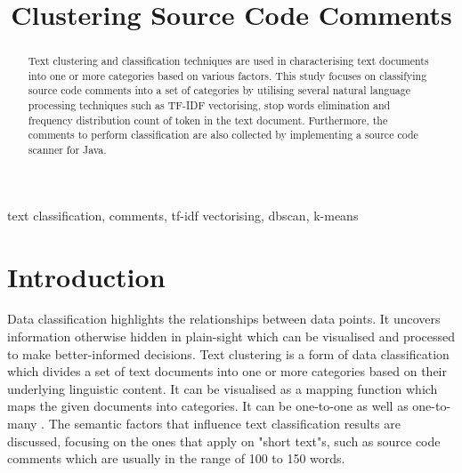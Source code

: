 \documentclass[conference]{IEEEtran}
\begin{document}
\title{Clustering Source Code Comments}

\author{
}

\maketitle

\begin{abstract}
Text clustering and classification techniques are used in characterising text documents into one or more categories based on various factors. This study focuses on classifying source code comments into a set of categories by utilising several natural language processing techniques such as TF-IDF vectorising, stop words elimination and frequency distribution count of token in the text document. Furthermore, the comments to perform classification are also collected by implementing a source code scanner for Java.
\end{abstract}

\begin{IEEEkeywords}
text classification, comments, tf-idf vectorising, dbscan, k-means
\end{IEEEkeywords}

\section{Introduction}

Data classification highlights the relationships between data points. It uncovers information otherwise hidden in plain-sight which can be visualised and processed to make better-informed decisions. Text clustering is a form of data classification which divides a set of text documents into one or more categories based on their underlying linguistic content. It can be visualised as a mapping function which maps the given documents into categories. It can be one-to-one as well as one-to-many \cite{5557448}. The semantic factors that influence text classification results are discussed, focusing on the ones that apply on "short text"s, such as source code comments which are usually in the range of 100 to 150 words.
\end{document}
